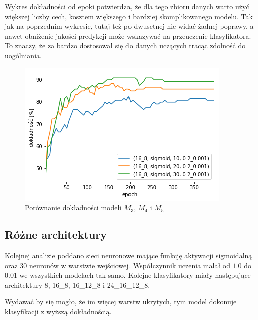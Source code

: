     Wykres dokładności od epoki potwierdza, że dla tego zbioru danych warto użyć większej liczby cech, kosztem większego i bardziej skomplikowanego modelu.
    Tak jak na poprzednim wykresie, tutaj też po dwusetnej nie widać żadnej poprawy, a nawet obniżenie jakości predykcji może wskazywać na przeuczenie klasyfikatora.
    To znaczy, że za bardzo dostosował się do danych uczących tracąc zdolność do uogólniania.

    \begin{figure}[htp]
        \centering
        \includegraphics[scale=0.8]{./img/feat-accuracy.png}
        \caption{Porównanie dokładności modeli $M_3$, $M_4$ i $M_5$}
    \end{figure}

    \subsection{Różne architektury}\label{subsec:różneArchitektury}

    Kolejnej analizie poddano sieci neuronowe mające funkcję aktywacji sigmoidalną oraz 30 neuronów w warstwie wejściowej.
    Współczynnik uczenia malał od $1.0$ do $0.01$ we wszystkich modelach tak samo.
    Kolejne klasyfikatory miały następujące architektury 8, 16\_8, 16\_12\_8 i 24\_16\_12\_8.

    Wydawać by się mogło, że im więcej warstw ukrytych, tym model dokonuje klasyfikacji z wyższą dokładnością.

